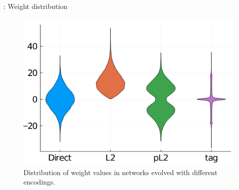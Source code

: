 \begin{frame}{\tciii{} \gene: Weight distribution}
    
    \begin{figure}
    \centering
    \includegraphics[width=.7\linewidth]{images/GENE/images/weights_distrib.png}
    \caption{Distribution of weight values in networks evolved with different encodings.}
    \end{figure}
\end{frame}


